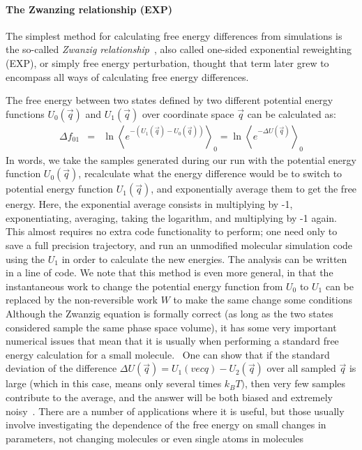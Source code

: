 \documentclass[9pt,bestpractices]{livecoms}
\newcommand{\expect}[1]{\left\langle{#1}\right\rangle}
\begin{document}
\paragraph{The Zwanzing relationship (EXP)}

The simplest method for calculating free energy
differences from simulations is the so-called \textit{Zwanzig
relationship}~\cite{orig.TPT}, also called one-sided exponential reweighting (EXP), or simply free energy perturbation, thought that term later grew to encompass all ways of calculating free energy differences.

The free energy between two states defined by two different potential energy functions 
$U_0(\vec{q})$ and $U_1(\vec{q})$ over coordinate space $\vec{q}$ can be calculated as:
\begin{eqnarray}
\Delta f_{01} & = & \ln \expect{e^{-(U_1(\vec{q}) - U_0(\vec{q}))}}_0 =  \ln \expect{e^{-\Delta U(\vec{q})} }_0
\end{eqnarray}\label{eqn.zwanzig}
In words, we take the samples generated during our run with the potential energy function $U_0(\vec{q})$, recalculate what the energy difference would be to switch to potential energy function $U_1(\vec{q})$, and exponentially average them to get the free energy.  Here, the exponential average consists in multiplying by -1, exponentiating, averaging, taking the logarithm, and multiplying by -1 again.  This almost requires no extra code functionality to perform; one need only to save a full precision trajectory, and run an unmodified molecular simulation code using the $U_1$ in order to calculate the new energies.  The analysis can be written in a line of code.  We note that this method is even more general, in that the instantaneous work to change the potential energy function from $U_0$ to $U_1$ can be replaced by the non-reversible work $W$ to make the same change some conditions~\cite{xx} 
Although the Zwanzig equation is formally correct (as long as the two states considered sample the same phase space volume), it has some very important numerical issues that mean that it is usually when performing a standard free energy calculation for a small molecule.~\cite{shirts.comparison,LuND:Appmcf}  One can show that if the standard deviation of the difference $\Delta U(\vec{q}) = U_1(vec{q})-U_2(\vec{q})$ over all sampled $\vec{q}$ is large (which in this case, means only several times $k_BT)$, then very few samples contribute to the average, and the answer will be both biased and extremely noisy~\cite{xx}.  There are a number of applications where it is useful, but those usually involve investigating the dependence of the free energy on small changes in parameters, not changing molecules or even single atoms in molecules~\cite{xx}
\end{document}
